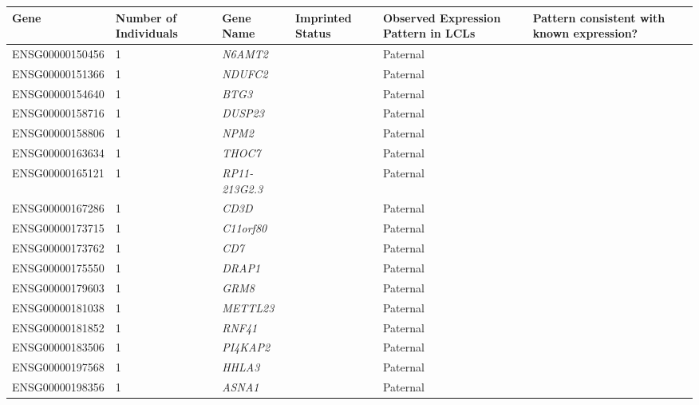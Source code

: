 \begin{table}
	\ContinuedFloat
\centering
\begin{adjustbox}{width={\textwidth}}
\begin{tabular}{@{}p{4cm}p{3cm}p{3cm}p{3cm}p{3cm}p{3cm}@{}}
\toprule Gene & 	Number of \newline Individuals & 	Gene Name&	Imprinted \newline Status	&Observed \newline Expression \newline Pattern \newline in LCLs	&Pattern \newline consistent with \newline known \newline expression? \\ \midrule
ENSG00000150456 & 1 & \emph{N6AMT2} & & Paternal &   \\ \hline
ENSG00000151366 & 1 & \emph{NDUFC2}& & Paternal &   \\ \hline
ENSG00000154640 & 1 & \emph{BTG3} & &  Paternal &   \\ \hline
ENSG00000158716 & 1 & \emph{DUSP23} & &  Paternal &   \\ \hline
ENSG00000158806 & 1 & \emph{NPM2} & &  Paternal &   \\ \hline
ENSG00000163634 & 1 & \emph{THOC7} & &  Paternal &   \\ \hline
ENSG00000165121 & 1 & \emph{RP11-213G2.3} & &  Paternal &  \\ \hline
ENSG00000167286 & 1 & \emph{CD3D} & & Paternal &   \\ \hline
ENSG00000173715 & 1 & \emph{C11orf80} & & Paternal &   \\ \hline
ENSG00000173762 & 1 & \emph{CD7} & &  Paternal &   \\ \hline
ENSG00000175550 & 1 & \emph{DRAP1} & &  Paternal &   \\ \hline
ENSG00000179603 & 1 & \emph{GRM8} & &  Paternal &   \\ \hline
ENSG00000181038 & 1 & \emph{METTL23} & &  Paternal &   \\ \hline
ENSG00000181852 & 1 & \emph{RNF41} & &  Paternal &   \\ \hline
ENSG00000183506 & 1 & \emph{PI4KAP2} & & Paternal &   \\ \hline
ENSG00000197568 & 1 & \emph{HHLA3} & &  Paternal &   \\ \hline
ENSG00000198356 & 1 & \emph{ASNA1} & &  Paternal &   \\ \hline

\end{tabular}
\end{adjustbox}
\end{table}
